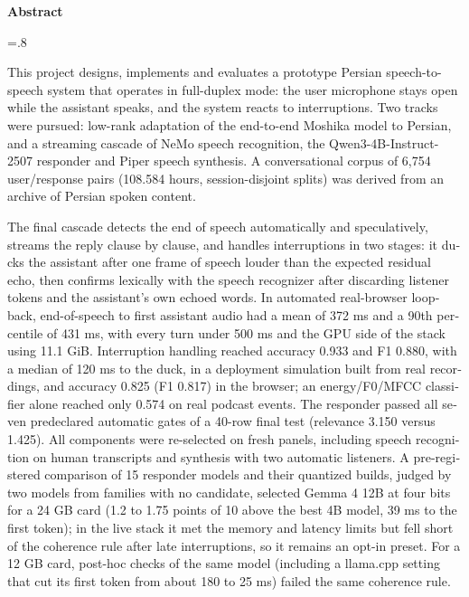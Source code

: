 

\begin{latin}

\begin{center}
\textbf{Abstract}
\end{center}
\baselineskip=.8\baselineskip

This project designs, implements and evaluates a prototype Persian
speech-to-speech system that operates in full-duplex mode: the user microphone
stays open while the assistant speaks, and the system reacts to interruptions.
Two tracks were pursued: low-rank adaptation of the end-to-end Moshika model to
Persian, and a streaming cascade of NeMo speech recognition, the
Qwen3-4B-Instruct-2507 responder and Piper speech synthesis. A conversational
corpus of 6,754 user/response pairs (108.584 hours, session-disjoint splits) was
derived from an archive of Persian spoken content.

The final cascade detects the end of speech automatically and speculatively,
streams the reply clause by clause, and handles interruptions in two stages: it
ducks the assistant after one frame of speech louder than the expected
residual echo, then confirms lexically with the speech recognizer after
discarding listener tokens and the assistant's own echoed words. In automated
real-browser loopback, end-of-speech to first assistant audio had a mean of
372 ms and a 90th percentile of 431 ms, with every turn under 500 ms and the
GPU side of the stack using 11.1 GiB. Interruption handling reached accuracy 0.933 and F1 0.880, with a
median of 120 ms to the duck, in a deployment simulation built from real
recordings, and accuracy 0.825 (F1 0.817) in the browser; an energy/F0/MFCC classifier
alone reached only 0.574 on real podcast events. The responder passed all seven
predeclared automatic gates of a 40-row final test (relevance 3.150 versus
1.425). All components were re-selected on fresh panels, including speech
recognition on human transcripts and synthesis with two automatic listeners. A
pre-registered comparison of 15 responder models and their quantized builds,
judged by two models from families with no candidate, selected Gemma 4 12B at
four bits for a 24 GB card (1.2 to 1.75 points of 10 above the best 4B model,
39 ms to the first token); in the live stack it met the memory and latency
limits but fell short of the coherence rule after late interruptions, so it
remains an opt-in preset. For a 12 GB card, post-hoc checks of the same model
(including a llama.cpp setting that cut its first token from about 180 to 25 ms)
failed the same coherence rule.


\end{latin}
